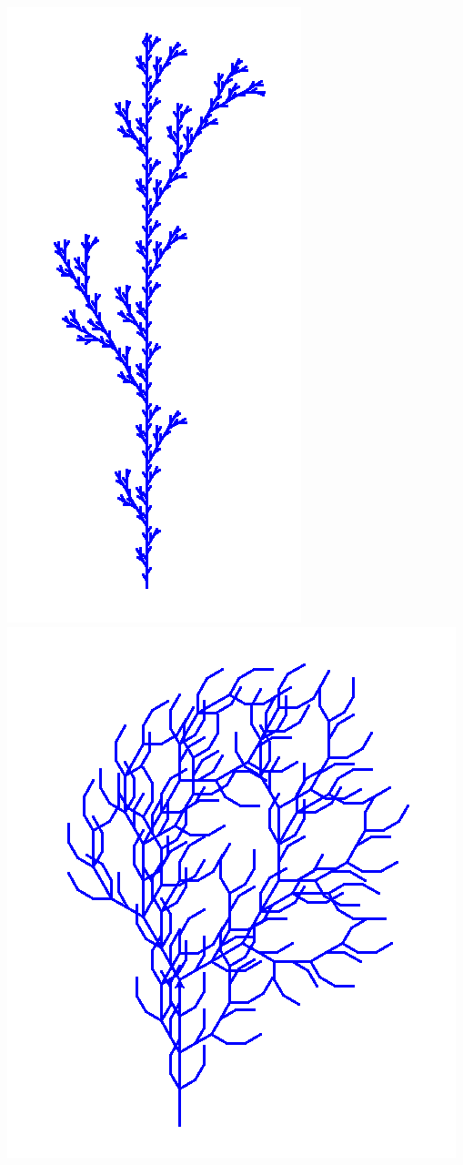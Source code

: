 \documentclass[11pt,class=report,crop=false]{standalone}
\begin{document}
\begin{center}
\includegraphics[scale=\myscale,scale=0.3]{figures/plante-02}\qquad\qquad
\includegraphics[scale=\myscale,scale=0.3]{figures/plante-03}
\end{center}
\end{document}
